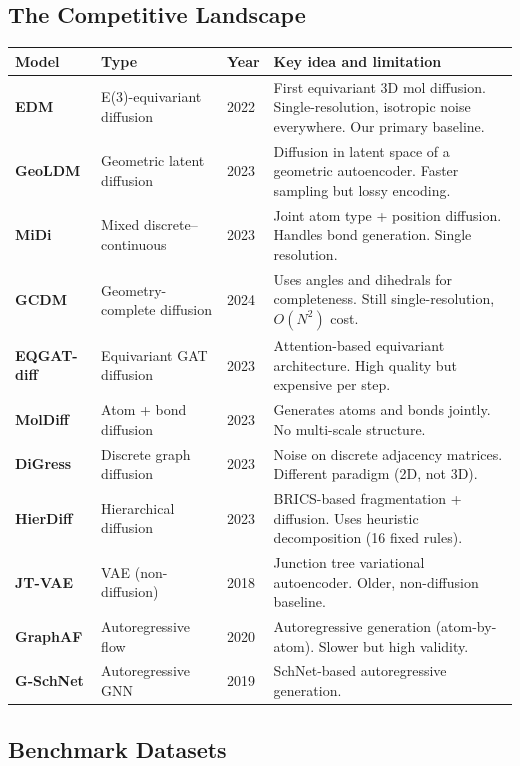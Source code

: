 \documentclass[12pt,a4paper]{article}
\begin{document}
\subsection{The Competitive Landscape}

\begin{center}
\renewcommand{\arraystretch}{1.25}
\begin{tabular}{lp{3.2cm}p{2cm}p{5.5cm}}
\toprule
\textbf{Model} & \textbf{Type} & \textbf{Year} & \textbf{Key idea and limitation} \\
\midrule
\textbf{EDM} & E(3)-equivariant diffusion & 2022 & First equivariant 3D mol diffusion. Single-resolution, isotropic noise everywhere. Our primary baseline. \\
\textbf{GeoLDM} & Geometric latent diffusion & 2023 & Diffusion in latent space of a geometric autoencoder. Faster sampling but lossy encoding. \\
\textbf{MiDi} & Mixed discrete--continuous & 2023 & Joint atom type + position diffusion. Handles bond generation. Single resolution. \\
\textbf{GCDM} & Geometry-complete diffusion & 2024 & Uses angles and dihedrals for completeness. Still single-resolution, $O(N^2)$ cost. \\
\textbf{EQGAT-diff} & Equivariant GAT diffusion & 2023 & Attention-based equivariant architecture. High quality but expensive per step. \\
\textbf{MolDiff} & Atom + bond diffusion & 2023 & Generates atoms and bonds jointly. No multi-scale structure. \\
\textbf{DiGress} & Discrete graph diffusion & 2023 & Noise on discrete adjacency matrices. Different paradigm (2D, not 3D). \\
\textbf{HierDiff} & Hierarchical diffusion & 2023 & BRICS-based fragmentation + diffusion. Uses heuristic decomposition (16 fixed rules). \\
\textbf{JT-VAE} & VAE (non-diffusion) & 2018 & Junction tree variational autoencoder. Older, non-diffusion baseline. \\
\textbf{GraphAF} & Autoregressive flow & 2020 & Autoregressive generation (atom-by-atom). Slower but high validity. \\
\textbf{G-SchNet} & Autoregressive GNN & 2019 & SchNet-based autoregressive generation. \\
\bottomrule
\end{tabular}
\end{center}

\subsection{Benchmark Datasets}
\end{document}
